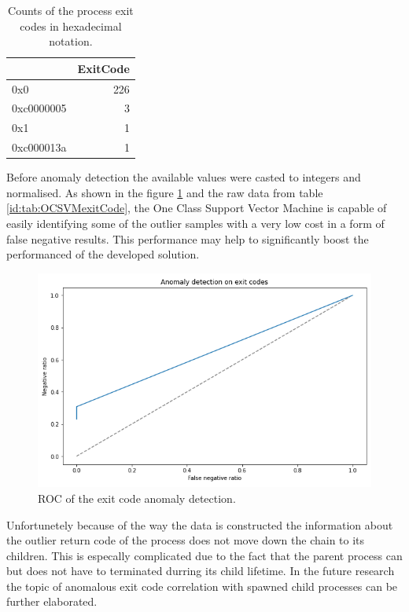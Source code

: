 \documentclass[a4paper,twoside,12pt]{book}
\begin{document}
\begin{table}
	\centering
	\caption{Counts of the process exit codes in hexadecimal notation.}
	\label{id:tab:exitCodeCounts}
	\begin{tabular}{lr}
		\toprule
		{} &  ExitCode \\
		\midrule
		0x0        &       226 \\
		0xc0000005 &         3 \\
		0x1        &         1 \\
		0xc000013a &         1 \\
		\bottomrule
	\end{tabular}		
\end{table}

Before anomaly detection the available values were casted to integers and normalised.
As shown in the figure \ref{fig:exitCodeROC} and the raw data from table \ref{id:tab:OCSVMexitCode},  
the One Class Support Vector Machine is capable of easily identifying some of the outlier 
samples with a very low cost in a form of false negative results. This performance may help to
significantly boost the performanced of the developed solution. 

\begin{figure}
	\centering
	\includegraphics[scale=0.9]{images/ExitCodeROC}
	\caption{ROC of the exit code anomaly detection.}
	\label{fig:exitCodeROC}
 \end{figure}

Unfortunetely because of the way the data is constructed the information about the outlier return code of the 
process does not move down the chain to its children. This is especally complicated due to the fact that the parent process
can but does not have to terminated durring its child lifetime. In the future research the topic of anomalous exit
code correlation with spawned child processes can be further elaborated.
\end{document}

